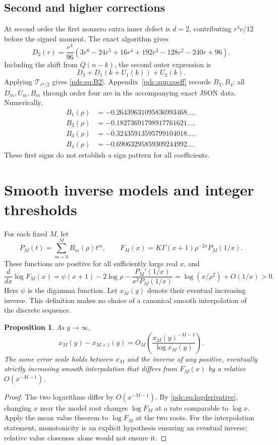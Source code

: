 \documentclass[11pt,letterpaper]{article}
\newtheorem{proposition}[theorem]{Proposition}
\theoremstyle{remark}\newtheorem{remark}[theorem]{Remark}
\begin{document}
\subsection{Second and higher corrections}
At second order the first nonzero extra inner defect is $d=2$, contributing $r^4c/12$ before the signed moment. The exact algorithm gives
\[
 D_2(r)=\frac{r^4}{96}\left(3r^6-24r^5+16r^4+192r^3
                         -128r^2-240r+96\right).
\]
Including the shift from $Q(n-k)$, the second outer expression is
\[
 D_2+D_1(k+U_1(k))+U_2(k).
\]
Applying $\mathcal T_{r^2/2}$ gives \eqref{pdc:eq:B2}. Appendix~\ref{pdc:app:coeff} records $B_3,B_4$; all $D_m,U_m,B_m$ through order four are in the accompanying exact JSON data. Numerically,
\begin{align*}
 B_1(\rho)&=-0.26439631095836993468\ldots,\\
 B_2(\rho)&=-0.18273691798917761621\ldots,\\
 B_3(\rho)&=-0.32435913595799104018\ldots,\\
 B_4(\rho)&=-0.69063295859309244992\ldots.
\end{align*}
These first signs do not establish a sign pattern for all coefficients.

\section{Smooth inverse models and integer thresholds}
\label{pdc:sec:inverse}
For each fixed $M$, let
\begin{equation}\label{pdc:eq:FM}
 P_M(t)=\sum_{m=0}^M B_m(\rho)t^m,\qquad
 F_M(x)=K\Gamma(x+1)\rho^{-2x}P_M(1/x).
\end{equation}
These functions are positive for all sufficiently large real $x$, and
\begin{equation}\label{pdc:eq:logderivative}
 \frac{d}{dx}\log F_M(x)
 =\psi(x+1)-2\log\rho-\frac{P_M'(1/x)}{x^2P_M(1/x)}
 =\log(x/\rho^2)+O(1/x)>0.
\end{equation}
Here $\psi$ is the digamma function. Let $x_M(y)$ denote their eventual increasing inverse. This definition makes no choice of a canonical smooth interpolation of the discrete sequence.

\begin{proposition}\label{pdc:prop:inverse-stability}
As $y\to\infty$,
\begin{equation}\label{pdc:eq:inverse-stability}
 x_M(y)-x_{M+1}(y)
       =O_M\!\left(\frac{x_M(y)^{-M-1}}{\log x_M(y)}\right).
\end{equation}
The same error scale holds between $x_M$ and the inverse of any positive, eventually strictly increasing smooth interpolation that differs from $F_M(x)$ by a relative $O(x^{-M-1})$.
\end{proposition}
\begin{proof}
The two logarithms differ by $O(x^{-M-1})$. By \eqref{pdc:eq:logderivative}, changing $x$ near the model root changes $\log F_M$ at a rate comparable to $\log x$. Apply the mean value theorem to $\log F_M$ at the two roots. For the interpolation statement, monotonicity is an explicit hypothesis ensuring an eventual inverse; relative value closeness alone would not ensure it.
\end{proof}
\end{document}
